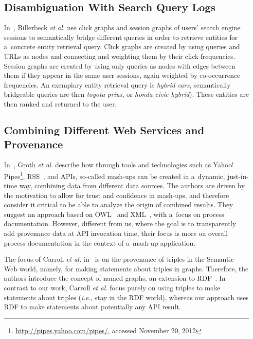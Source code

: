 \subsection{Disambiguation With Search Query Logs}

In~\cite{billerbeck2010rankingentities}, Billerbeck \emph{et al.}
use click graphs and session graphs
of users' search engine sessions
to semantically bridge different queries in order to
retrieve entities for a~concrete entity retrieval query.
Click graphs are created by using queries and URLs as nodes
and connecting and weighting them by their click frequencies.
Session graphs are created by using only queries as nodes
with edges between them if they appear in the same user sessions,
again weighted by co-occurrence frequencies.
An exemplary entity retrieval query is \emph{hybrid cars},
semantically bridgeable queries are then \emph{toyota prius},
or \emph{honda civic hybrid}).
These entities are then ranked and returned to the user.

\subsection{Combining Different Web Services and Provenance}

In~\cite{groth2009mashups}, Groth \emph{et al.}
describe how through tools and technologies such as
Yahoo! Pipes\footnote{\url{http://pipes.yahoo.com/pipes/},
accessed November 20, 2012},
RSS~\cite{cadenhead2006rss}, and APIs,
so-called mash-ups can be created in a~dynamic, just-in-time way,
combining data from different data sources.
The authors are driven by the motivation to allow for trust
and confidence in mash-ups, and therefore
consider it critical to be able to analyze the origin
of combined results.
They suggest an approach based on OWL~\cite{mcguinness2004owl}
and XML~\cite{bray2008xml},
with a~focus on process documentation.
However, different from us, where the goal is to transparently
add provenance data at API invocation time,
their focus is more on overall process documentation
in the context of a~mash-up application.

The focus of Carroll \emph{et al.} in~\cite{carroll2005namedgraphs}
is on the provenance of triples in the Semantic Web world, namely,
for making statements about triples in graphs.
Therefore, the authors introduce the concept of named graphs,
an extension to RDF~\cite{klyne2004rdf}.
In contrast to our work, Carroll \emph{et al.}
focus purely on using triples to make statements about triples
(\emph{i.e.}, stay in the RDF world),
whereas our approach uses RDF to make statements
about potentially any API result.
 
